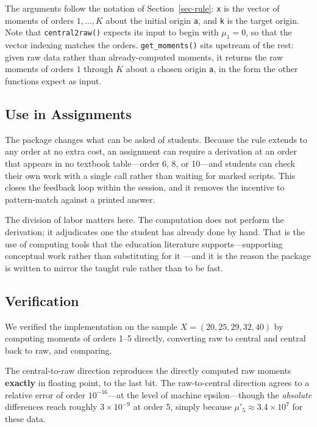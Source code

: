 \documentclass[
  12pt]{article}
\begin{document}
The arguments follow the notation of Section~\ref{sec-rule}: \texttt{x} is the vector of moments of orders $1, \dots, K$ about the initial origin \texttt{a}, and \texttt{k} is the target origin. Note that \texttt{central2raw()} expects its input to begin with $\mu_1 = 0$, so that the vector indexing matches the orders. \texttt{get\_moments()} sits upstream of the rest: given raw data rather than already-computed moments, it returns the raw moments of orders $1$ through $K$ about a chosen origin \texttt{a}, in the form the other functions expect as input.

\subsection{Use in Assignments}

The package changes what can be asked of students. Because the rule extends to any order at no extra cost, an assignment can require a derivation at an order that appears in no textbook table---order 6, 8, or 10---and students can check their own work with a single call rather than waiting for marked scripts. This closes the feedback loop within the session, and it removes the incentive to pattern-match against a printed answer.

The division of labor matters here. The computation does not perform the derivation; it adjudicates one the student has already done by hand. That is the use of computing tools that the education literature supports---supporting conceptual work rather than substituting for it \citep{zavez2025}---and it is the reason the package is written to mirror the taught rule rather than to be fast.

\subsection{Verification}

We verified the implementation on the sample $X = (20, 25, 29, 32, 40)$ by computing moments of orders 1--5 directly, converting raw to central and central back to raw, and comparing.

The central-to-raw direction reproduces the directly computed raw moments \textbf{exactly} in floating point, to the last bit. The raw-to-central direction agrees to a relative error of order $10^{-16}$---at the level of machine epsilon---though the \emph{absolute} differences reach roughly $3 \times 10^{-9}$ at order 5, simply because $\mu'_5 \approx 3.4 \times 10^{7}$ for these data.
\end{document}

